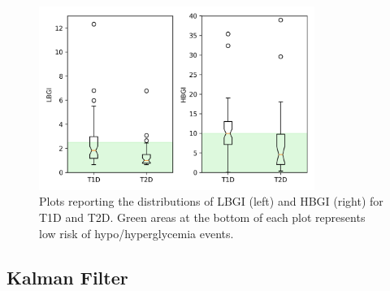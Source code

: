 \begin{figure}[tb!]
	\caption{Plots reporting the distributions of LBGI (left) and HBGI (right) for T1D and T2D. Green areas at the bottom of each plot represents low risk of hypo/hyperglycemia events.
	}\label{fig:plots}
	\centering
	\includegraphics[width=0.8\textwidth]{images/part2/boxes.png}
\end{figure}

\subsection{Kalman Filter}


